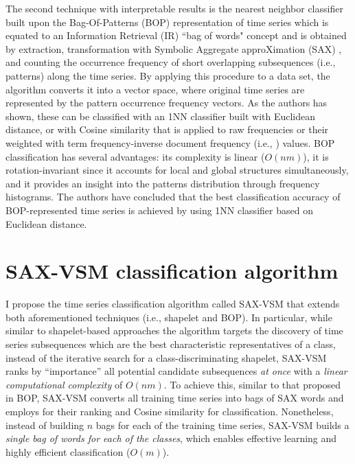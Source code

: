 The second technique with interpretable results is the nearest neighbor classifier built upon the Bag-Of-Patterns (BOP) representation of 
time series \cite{citeulike:10525778} which is equated to an Information Retrieval (IR) ``bag of words" concept and is obtained by extraction, 
transformation with Symbolic Aggregate approXimation (SAX) \cite{sax}, and counting the occurrence frequency of short overlapping 
subsequences (i.e., patterns) along the time series.
By applying this procedure to a data set, the algorithm converts it into a vector space, where original time series are 
represented by the pattern occurrence frequency vectors. As the authors has shown, these can be classified with an 1NN classifier 
built with Euclidean distance, or with Cosine similarity that is applied to raw frequencies or their weighted with 
term frequency-inverse document frequency (i.e., \tfidf \cite{salton-71}) values. 
BOP classification has several advantages: its complexity is linear ($O(nm)$), it is rotation-invariant since it accounts for local and 
global structures simultaneously, and it provides an insight into the patterns distribution through frequency histograms.
The authors have concluded that the best classification accuracy of BOP-represented time series is achieved by using 1NN classifier 
based on Euclidean distance. 

\section{SAX-VSM classification algorithm} \label{sax_vsm_background}
I propose the time series classification algorithm called \mbox{SAX-VSM} that extends both aforementioned techniques (i.e., shapelet and BOP). 
In particular, while similar to shapelet-based approaches the algorithm targets the discovery of time series subsequences which 
are the best characteristic representatives of a class, 
instead of the iterative search for a class-discriminating shapelet, \mbox{SAX-VSM} ranks by “importance” all potential candidate 
subsequences \textit{at once} with a \textit{linear computational complexity} of $O(nm)$.
To achieve this, similar to that proposed in BOP, \mbox{SAX-VSM} converts all training time series into bags of SAX 
words and employs \tfidf for their ranking and Cosine similarity for classification. 
Nonetheless, instead of building $n$ bags for each of the training time series, SAX-VSM builds a 
\textit{single bag of words for each of the classes}, which enables effective learning and highly efficient classification ($O(m)$).

